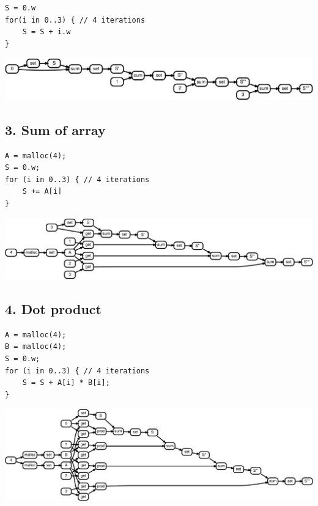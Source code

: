 \documentclass[11pt]{article}
\begin{document}
\begin{lstlisting}
S = 0.w
for(i in 0..3) { // 4 iterations
    S = S + i.w
}
\end{lstlisting}

\includegraphics[scale=0.25]{rtd42}

\pagebreak\subsection*{3. Sum of array}

\begin{lstlisting}
A = malloc(4);
S = 0.w;
for (i in 0..3) { // 4 iterations
    S += A[i]
}
\end{lstlisting}

\includegraphics[scale=0.25]{rtd43}

\pagebreak\subsection*{4. Dot product}

\begin{lstlisting}
A = malloc(4);
B = malloc(4);
S = 0.w;
for (i in 0..3) { // 4 iterations
    S = S + A[i] * B[i];
}
\end{lstlisting}

\includegraphics[scale=0.25]{rtd44}
\end{document}
